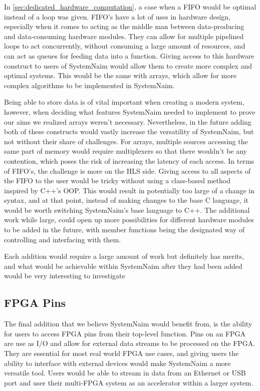 In \autoref{sec:dedicated_hardware_computation}, a case when a FIFO would be optimal instead of a loop was given. FIFO's have a lot of uses in hardware design, especially when it comes to acting as the middle man between data-producing and data-consuming hardware modules. They can allow for multiple pipelined loops to act concurrently, without consuming a large amount of resources, and can act as queues for feeding data into a function. Giving access to this hardware construct to users of SystemNaim would allow them to create more complex and optimal systems. This would be the same with arrays, which allow for more complex algorithms to be implemented in SystemNaim. 

Being able to store data is of vital important when creating a modern system, however, when deciding what features SystemNaim needed to implement to prove our aims we realized arrays weren't necessary. Nevertheless, in the future adding both of these constructs would vastly increase the versatility of SystemNaim, but not without their share of challenges. For arrays, multiple sources accessing the same part of memory would require multiplexers so that there wouldn't be any contention, which poses the risk of increasing the latency of each access. In terms of FIFO's, the challenge is more on the HLS side. Giving access to all aspects of the FIFO to the user would be tricky without using a class-based method inspired by C++'s OOP. This would result in potentially too large of a change in syntax, and at that point, instead of making changes to the base C language, it would be worth switching SystemNaim's base language to C++. The additional work while large, could open up more possibilities for different hardware modules to be added in the future, with member functions being the designated way of controlling and interfacing with them.

Each addition would require a large amount of work but definitely has merits, and what would be achievable within SystemNaim after they had been added would be very interesting to investigate

\subsection{FPGA Pins}

The final addition that we believe SystemNaim would benefit from, is the ability for users to access FPGA pins from their top-level function. Pins on an FPGA are use as I/O and allow for external data streams to be processed on the FPGA. They are essential for most real world FPGA use cases, and giving users the ability to interface with external devices would make SystemNaim a more versatile tool. Users would be able to stream in data from an Ethernet or USB port and user their multi-FPGA system as an accelerator within a larger system. 

